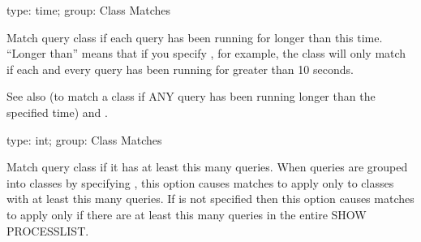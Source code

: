 \documentclass[letterpaper,10pt,english]{sphinxmanual}
\begin{document}
\begin{fulllineitems}
\label{\detokenize{mariadb-kill:cmdoption-mariadb-kill-each-busy-time}}
type: time; group: Class Matches

Match query class if each query has been running for longer than this time.
“Longer than” means that if you specify , for example, the class will
only match if each and every query has been running for greater than 10
seconds.

See also {\hyperref[\detokenize{mariadb-kill:cmdoption-mariadb-kill-any-busy-time}]{}} (to match a class if ANY query has been running
longer than the specified time) and {\hyperref[\detokenize{mariadb-kill:cmdoption-mariadb-kill-busy-time}]{}}.

\end{fulllineitems}


\begin{fulllineitems}
\label{\detokenize{mariadb-kill:cmdoption-mariadb-kill-query-count}}
type: int; group: Class Matches

Match query class if it has at least this many queries.  When queries are
grouped into classes by specifying {\hyperref[\detokenize{mariadb-kill:cmdoption-mariadb-kill-group-by}]{}}, this option causes matches
to apply only to classes with at least this many queries.  If {\hyperref[\detokenize{mariadb-kill:cmdoption-mariadb-kill-group-by}]{}}
is not specified then this option causes matches to apply only if there
are at least this many queries in the entire SHOW PROCESSLIST.

\end{fulllineitems}
\end{document}
